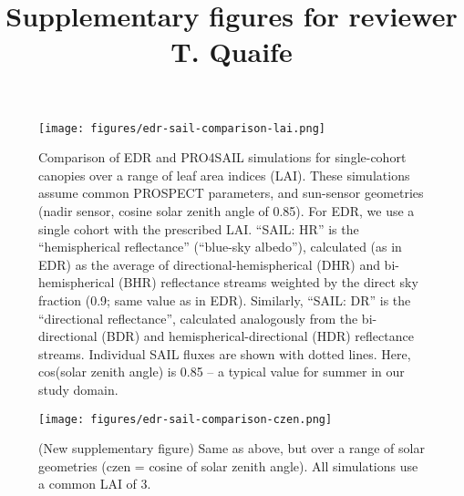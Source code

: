 \documentclass{article}
\title{Supplementary figures for reviewer T. Quaife}
\begin{document}
\maketitle

\begin{figure}[ht]
  \centering
  \texttt{[image: figures/edr-sail-comparison-lai.png]}
  \caption{Comparison of EDR and PRO4SAIL simulations for single-cohort canopies over a range of leaf area indices (LAI). These simulations assume common PROSPECT parameters, and sun-sensor geometries (nadir sensor, cosine solar zenith angle of 0.85). For EDR, we use a single cohort with the prescribed LAI. “SAIL: HR” is the “hemispherical reflectance” (“blue-sky albedo”), calculated (as in EDR) as the average of directional-hemispherical (DHR) and bi-hemispherical (BHR) reflectance streams weighted by the direct sky fraction (0.9; same value as in EDR). Similarly, “SAIL: DR” is the “directional reflectance”, calculated analogously from the bi-directional (BDR) and hemispherical-directional (HDR) reflectance streams. Individual SAIL fluxes are shown with dotted lines. Here, cos(solar zenith angle) is 0.85 -- a typical value for summer in our study domain.
}
\end{figure}

\begin{figure}[ht]
  \centering
  \texttt{[image: figures/edr-sail-comparison-czen.png]}
  \caption{(New supplementary figure) Same as above, but over a range of solar geometries (czen = cosine of solar zenith angle). All simulations use a common LAI of 3.}
\end{figure}
\end{document}
